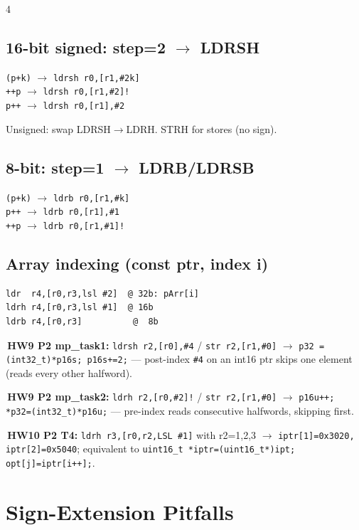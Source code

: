 \documentclass[8pt,landscape]{extarticle}
\newcommand{\asm}[1]{\texttt{\scriptsize #1}}
\newcommand{\cee}[1]{\texttt{\scriptsize #1}}
\newenvironment{ex}
  {\par\smallskip\noindent{\scriptsize\color{red!55!black}\textbf{Ex.}}\,\scriptsize\ignorespaces}
  {\par}
\begin{document}
\begin{multicols*}{4}
\subsection{16-bit signed: step=2 $\to$ LDRSH}
\cee{*(p+k)} $\to$ \asm{ldrsh r0,[r1,\#2k]}\\
\cee{*++p}\;   $\to$ \asm{ldrsh r0,[r1,\#2]!}\\
\cee{*p++}\;   $\to$ \asm{ldrsh r0,[r1],\#2}

Unsigned: swap LDRSH$\to$LDRH. STRH for stores (no sign).

\subsection{8-bit: step=1 $\to$ LDRB/LDRSB}
\cee{*(p+k)} $\to$ \asm{ldrb r0,[r1,\#k]}\\
\cee{*p++}\;   $\to$ \asm{ldrb r0,[r1],\#1}\\
\cee{*++p}\;   $\to$ \asm{ldrb r0,[r1,\#1]!}

\subsection{Array indexing (const ptr, index i)}
\begin{lstlisting}
ldr  r4,[r0,r3,lsl #2]  @ 32b: pArr[i]
ldrh r4,[r0,r3,lsl #1]  @ 16b
ldrb r4,[r0,r3]          @  8b
\end{lstlisting}

\begin{ex}\textbf{HW9 P2 mp\_task1:} \asm{ldrsh r2,[r0],\#4} / \asm{str r2,[r1,\#0]} $\to$ \cee{*p32 = (int32\_t)*p16s; p16s+=2;} --- post-index \texttt{\#4} on an int16 ptr skips one element (reads every other halfword).\end{ex}

\begin{ex}\textbf{HW9 P2 mp\_task2:} \asm{ldrh r2,[r0,\#2]!} / \asm{str r2,[r1,\#0]} $\to$ \cee{p16u++; *p32=(int32\_t)*p16u;} --- pre-index reads consecutive halfwords, skipping first.\end{ex}

\begin{ex}\textbf{HW10 P2 T4:} \asm{ldrh r3,[r0,r2,LSL \#1]} with r2=1,2,3 $\to$ \cee{iptr[1]=0x3020, iptr[2]=0x5040}; equivalent to \cee{uint16\_t *iptr=(uint16\_t*)ipt; opt[j]=iptr[i++];}.\end{ex}

\section{Sign-Extension Pitfalls}


\end{multicols*}
\end{document}
